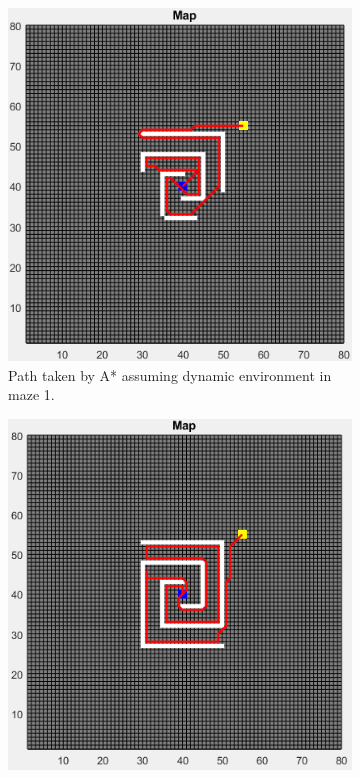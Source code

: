 \begin{figure}
	\centering
    \begin{subfigure}[t]{0.32\columnwidth}
		\centering
		\includegraphics[width=\textwidth]{images/a_star_dynamic_maze_1.png}
		\caption{Path taken by A* assuming dynamic environment in maze 1.}
        \label{fig:a_star_dynamic_path_maze_1}
	\end{subfigure}
    \hfill
	\begin{subfigure}[t]{0.32\columnwidth}
		\centering
		\includegraphics[width=\textwidth]{images/dijkstra_dynamic_maze_1.png}

\end{subfigure}
\end{figure}
